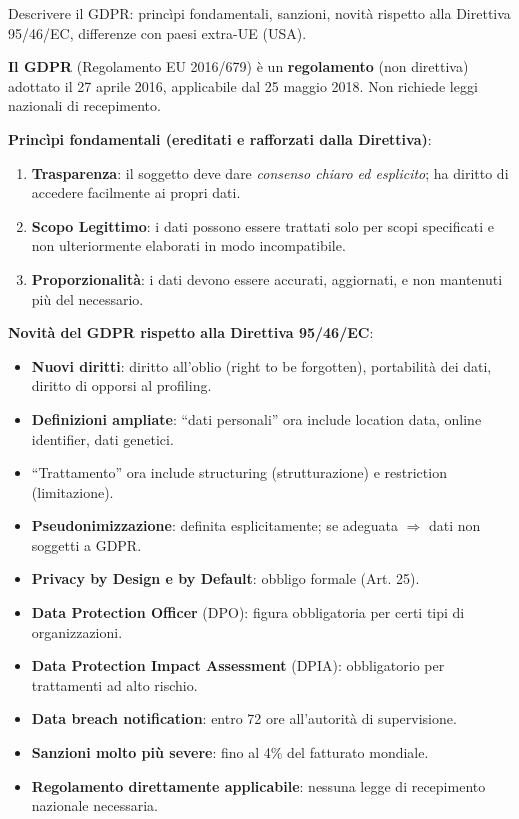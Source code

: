 \documentclass[a4paper,11pt]{article}
\begin{document}
\begin{domanda}
Descrivere il GDPR: princìpi fondamentali, sanzioni, novit\`{a} rispetto alla Direttiva 95/46/EC, differenze con paesi extra-UE (USA).
\end{domanda}

\textbf{Il GDPR} (Regolamento EU 2016/679) \`{e} un \textbf{regolamento} (non direttiva) adottato il 27 aprile 2016, applicabile dal 25 maggio 2018. Non richiede leggi nazionali di recepimento.

\textbf{Princìpi fondamentali (ereditati e rafforzati dalla Direttiva)}:
\begin{enumerate}
  \item \textbf{Trasparenza}: il soggetto deve dare \emph{consenso chiaro ed esplicito}; ha diritto di accedere facilmente ai propri dati.
  \item \textbf{Scopo Legittimo}: i dati possono essere trattati solo per scopi specificati e non ulteriormente elaborati in modo incompatibile.
  \item \textbf{Proporzionalit\`{a}}: i dati devono essere accurati, aggiornati, e non mantenuti pi\`{u} del necessario.
\end{enumerate}

\textbf{Novit\`{a} del GDPR rispetto alla Direttiva 95/46/EC}:
\begin{itemize}
  \item \textbf{Nuovi diritti}: diritto all'oblio (right to be forgotten), portabilit\`{a} dei dati, diritto di opporsi al profiling.
  \item \textbf{Definizioni ampliate}: ``dati personali'' ora include location data, online identifier, dati genetici.
  \item ``Trattamento'' ora include structuring (strutturazione) e restriction (limitazione).
  \item \textbf{Pseudonimizzazione}: definita esplicitamente; se adeguata $\Rightarrow$ dati non soggetti a GDPR.
  \item \textbf{Privacy by Design e by Default}: obbligo formale (Art. 25).
  \item \textbf{Data Protection Officer} (DPO): figura obbligatoria per certi tipi di organizzazioni.
  \item \textbf{Data Protection Impact Assessment} (DPIA): obbligatorio per trattamenti ad alto rischio.
  \item \textbf{Data breach notification}: entro 72 ore all'autorit\`{a} di supervisione.
  \item \textbf{Sanzioni molto pi\`{u} severe}: fino al 4\% del fatturato mondiale.
  \item \textbf{Regolamento direttamente applicabile}: nessuna legge di recepimento nazionale necessaria.
\end{itemize}
\end{document}
